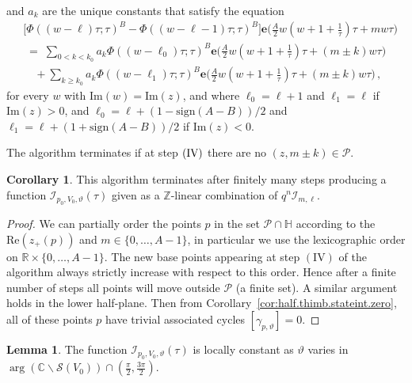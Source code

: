 \documentclass[12pt,reqno]{amsart}
\theoremstyle{definition}
\newtheorem{lemma}[theorem]{Lemma}
\newtheorem{corollary}[theorem]{Corollary}
\def\BZ{\mathbb Z}
\def\BR{\mathbb R}
\def\BC{\mathbb C}
\def\BH{\mathbb H}
\def\calI{\mathcal I}
\def\calP{\mathcal P}
\def\calS{\mathcal S}
\def\Re{\mathrm{Re}}
\def\Im{\mathrm{Im}}
\def\be{\begin{equation}}
\def\ee{\end{equation}}
\def\e{\mathbf e}
\renewcommand{\=}{\;=\;}
\begin{document}
\begin{itemize}
\begin{itemize}
\end{itemize}
and $a_k$ are the unique constants that satisfy the equation
\be\label{eq:alg-tails}
\begin{aligned}
& \big[\Phi((w-\ell)\tau;\tau)^B-\Phi((w-\ell-1)\tau;\tau)^B\big] \e\Big(\frac{A}{2}w(w+1+\tfrac{1}{\tau})\tau+mw\tau\Big)\\
&\=\sum_{0<k<k_0}a_k \Phi((w-\ell_0)\tau;\tau)^B\e\Big(\frac{A}{2}w(w+1+\tfrac{1}{\tau})\tau+(m\pm k)w\tau\Big)\\
&\quad + \sum_{k\geq k_0}a_k  \Phi((w-\ell_1)\tau;\tau)^B\e\Big(\frac{A}{2}w(w+1+\tfrac{1}{\tau})\tau+(m\pm k)w\tau\Big)\,,
\end{aligned}
\ee
for every $w$ with $\Im(w)=\Im(z)$, and where $\ell_0=\ell+1$ and $\ell_1=\ell$ if $\Im(z)>0$, and $\ell_0=\ell+(1-\mathrm{sign}(A-B))/2$ and $\ell_1=\ell+(1+\mathrm{sign}(A-B))/2$ if $\Im(z)<0$.
\end{itemize}
The algorithm terminates if at step $(\rm IV)$ there are no $(z,m\pm k)\in\calP$.
\begin{corollary}\label{cor:end-algorithm}
This algorithm terminates after finitely many steps producing a function $\calI_{p_0,V_0,\vartheta}(\tau)$ given as a $\BZ$-linear combination of $q^n\calI_{m,\ell}$.
\end{corollary}
\begin{proof}
We can partially order the points $p$ in the set $\calP\cap\BH$ according to the $\Re(z_{+}(p))$ and $m\in \{0,\ldots ,A-1\}$, in particular we use the lexicographic order on $\BR\times\{0,\ldots ,A-1\}$. The new base points appearing at step $(\mathrm{IV})$ of the algorithm always strictly increase with respect to this order. Hence after a finite number of steps all points will move outside $\calP$ (a finite set). A similar argument holds in the lower half-plane. Then from Corollary~\ref{cor:half.thimb.stateint.zero}, all of these points $p$ have trivial associated cycles $[\gamma_{p,\vartheta}]=0$. 
\end{proof}
\begin{lemma}
The function $\calI_{p_0,V_0,\vartheta}(\tau)$ is locally constant as $\vartheta$ varies in $\arg(\BC\backslash\calS(V_{0}))\cap(\tfrac{\pi}{2},\tfrac{3\pi}{2})$.
\end{lemma}
\end{document}
